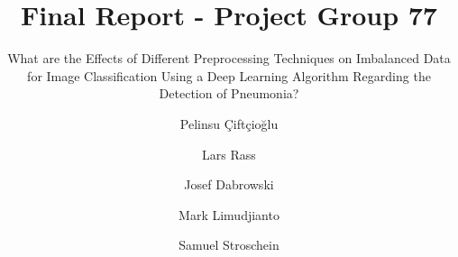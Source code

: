 \documentclass[runningheads]{llncs}
\begin{document}
%
\title{Final Report - Project Group 77}
\subtitle{What are the Effects of Different Preprocessing Techniques on Imbalanced Data for Image Classification Using a Deep Learning Algorithm Regarding the Detection of Pneumonia?}
%
%
\author{Pelinsu Çiftçioğlu \and
Lars Rass \and
Josef Dabrowski \and
Mark Limudjianto \and
Samuel Stroschein}
%
\authorrunning{ }
%
%
\maketitle              %
%
\begin{abstract}


\end{abstract}

%
%
%


















%


\end{document}
